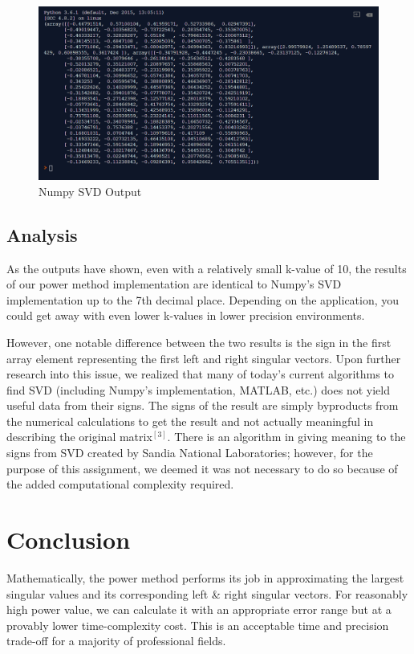 \documentclass[12pt]{article}
\begin{document}
\begin{figure}[h!]
    \caption{Numpy SVD Output}
    \centering
    \includegraphics[scale=0.65]{svd1}
\end{figure}

\newpage

\subsection{Analysis}
\vspace{-6pt}
\hspace{+24pt} As the outputs have shown, even with a relatively small k-value of 10, the results of our power method implementation are identical to Numpy's SVD implementation up to the 7th decimal place. Depending on the application, you could get away with even lower k-values in lower precision environments.

\hspace{24pt}However, one notable difference between the two results is the sign in the first array element representing the first left and right singular vectors. Upon further research into this issue, we realized that many of today's current algorithms to find SVD (including Numpy's implementation, MATLAB, etc.) does not yield useful data from their signs. The signs of the result are simply byproducts from the numerical calculations to get the result and not actually meaningful in describing the original matrix$^{[3]}$. There is an algorithm in giving meaning to the signs from SVD created by Sandia National Laboratories; however, for the purpose of this assignment, we deemed it was not necessary to do so because of the added computational complexity required.
\vspace{-8pt}
\section{Conclusion}
\vspace{-10pt}
\hspace{+24pt}Mathematically, the power method performs its job in approximating the largest singular values and its corresponding left \& right singular vectors. For reasonably high power value, we can calculate it with an appropriate error range but at a provably lower time-complexity cost. This is an acceptable time and precision trade-off for a majority of professional fields.
\end{document}
